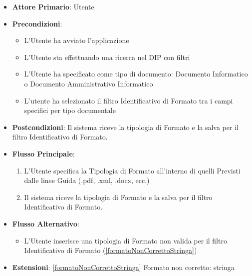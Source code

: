 \begin{itemize}
      \item \textbf{Attore Primario}: Utente
      \item \textbf{Precondizioni}: 
      \begin{itemize}
            \item L'Utente ha avviato l'applicazione
            \item L'Utente sta effettuando una ricerca nel DIP con filtri
            \item L'Utente ha specificato come tipo di documento: Documento Informatico o Documento Amministrativo Informatico
            \item L'utente ha selezionato il filtro Identificativo di Formato tra i campi specifici per tipo documentale
      \end{itemize}
      \item \textbf{Postcondizioni}: Il sistema riceve la tipologia di Formato e la salva per il filtro Identificativo di Formato.
      \item \textbf{Flusso Principale}:
      \begin{enumerate}
            \item L'Utente specifica la Tipologia di Formato all'interno di quelli Previsti dalle linee Guida (.pdf, .xml, .docx, ecc.)
            \item Il sistema riceve la tipologia di Formato e la salva per il filtro Identificativo di Formato.
      \end{enumerate}
      \item \textbf{Flusso Alternativo}:
      \begin{itemize}
            \item L'Utente inserisce una tipologia di Formato non valida per il filtro Identificativo di Formato (\ref{formatoNonCorrettoStringa})
      \end{itemize}
      \item \textbf{Estensioni}: \ref{formatoNonCorrettoStringa} Formato non corretto: stringa
\end{itemize}

